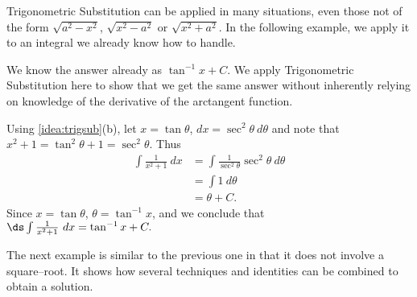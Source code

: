 Trigonometric Substitution can be applied in many situations, even those not of the form $\sqrt{a^2-x^2}$, $\sqrt{x^2-a^2}$ or $\sqrt{x^2+a^2}$. In the following example, we apply it to an integral we already know how to handle.

{We know the answer already as $\tan^{-1}x+C$. We apply Trig\-o\-no\-metric Substitution here to show that we get the same answer without inherently relying on knowledge of the derivative of the arctangent function.

Using \autoref{idea:trigsub}(b), let $x=\tan\theta$, $dx=\sec^2\theta\ d\theta$ and note that $x^2+1 = \tan^2\theta+1 = \sec^2\theta$. Thus
\begin{align*}
\int \frac1{x^2+1}\ dx &= \int \frac{1}{\sec^2\theta}\sec^2\theta\ d\theta \\
			&= \int 1\ d\theta\\
			&= \theta + C.
\end{align*}
Since $x=\tan \theta$, $\theta = \tan^{-1}x$, and we conclude that $\ds \int\frac1{x^2+1}\ dx = \tan^{-1}x+C.$}

The next example is similar to the previous one in that it does not involve a square--root. It shows how several techniques and identities can be combined to obtain a solution.

